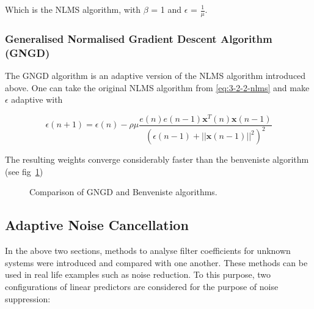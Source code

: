 \documentclass[main.tex]{subfiles}
\begin{document}
Which is the NLMS algorithm, with $\beta$ = 1 and $\epsilon$ = $\frac{1}{\mu}$.



\subsubsection{Generalised Normalised Gradient Descent Algorithm (GNGD)}

The GNGD algorithm is an adaptive version of the NLMS algorithm introduced above. One can take the original NLMS algorithm from \ref{eq:3-2-2-nlms} and make $\epsilon$ adaptive with

\begin{equation}
\epsilon(n+1) = \epsilon(n) - \rho\mu\frac{e(n)e(n-1)\textbf{x}^T(n)\textbf{x}(n-1)}{(\epsilon(n-1)+||\textbf{x}(n-1)||^2)^2}
\end{equation}

The resulting weights converge considerably faster than the benveniste algorithm (see fig~\ref{fig:q3_2_c})

\begin{figure}[H]
	\centering 
	\resizebox{0.7\textwidth}{!}{}
	\caption{Comparison of GNGD and Benveniste algorithms.}
	\label{fig:q3_2_c}
\end{figure}

























\subsection{Adaptive Noise Cancellation}

In the above two sections, methods to analyse filter coefficients for unknown systems were introduced and compared with one another. These methods can be used in real life examples such as noise reduction.	To this purpose, two configurations of linear predictors are considered for the purpose of noise suppression:
\end{document}
